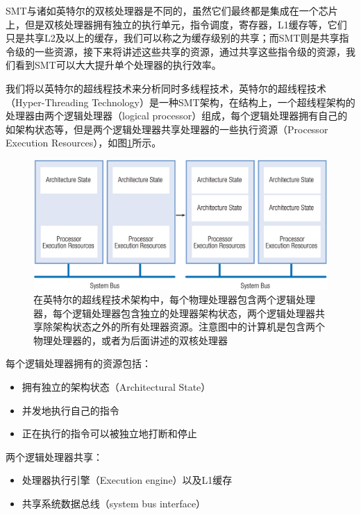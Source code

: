 SMT与诸如英特尔的双核处理器是不同的，虽然它们最终都是集成在一个芯片上，但是双核处理器拥有独立的执行单元，指令调度，寄存器，L1缓存等，它们只是共享L2及以上的缓存，我们可以称之为缓存级别的共享；而SMT则是共享指令级的一些资源，接下来将讲述这些共享的资源，通过共享这些指令级的资源，我们看到SMT可以大大提升单个处理器的执行效率。

我们将以英特尔的超线程技术来分析同时多线程技术，英特尔的超线程技术（Hyper-Threading Technology）是一种SMT架构，在结构上，一个超线程架构的处理器由两个逻辑处理器（logical processor）组成，每个逻辑处理器拥有自己的如架构状态等，但是两个逻辑处理器共享处理器的一些执行资源（Processor Execution Resources），如图\ref{f:rp-hyper-threading}所示。

\begin{figure}
	\includegraphics[width=1.\textwidth]{figures/rp/hyper-threading}
	\caption{在英特尔的超线程技术架构中，每个物理处理器包含两个逻辑处理器，每个逻辑处理器包含独立的处理器架构状态，两个逻辑处理器共享除架构状态之外的所有处理器资源。注意图中的计算机是包含两个物理处理器的，或者为后面讲述的双核处理器}
	\label{f:rp-hyper-threading}
\end{figure}

每个逻辑处理器拥有的资源包括：

\begin{itemize}
	\item 拥有独立的架构状态（Architectural State）
	\item 并发地执行自己的指令
	\item 正在执行的指令可以被独立地打断和停止
\end{itemize}

两个逻辑处理器共享：
\begin{itemize}
	\item 处理器执行引擎（Execution engine）以及L1缓存
	\item 共享系统数据总线（system bus interface）
\end{itemize}

